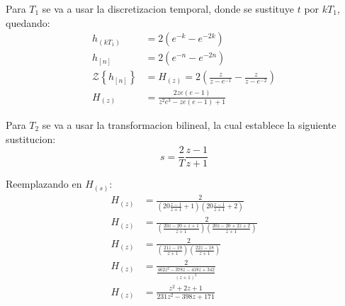 \documentclass[a4paper,12pt]{report}
\begin{document}
\begin{enumerate}[label=\alph*), left=0pt]
                Para $T_1$ se va a usar la discretizacion temporal, donde se sustituye $t$ por $kT_1$, quedando:
                \begin{align*}
                    h_{(kT_1)} &= 2\left(e^{-k} - e^{-2 k}\right)\\
                    h_{[n]} &= 2\left(e^{-n} - e^{-2 n}\right)\\
                    \mathcal{Z}\left\{h_{[n]}\right\} &= H_{(z)} = 2\left(\frac{z}{z - e^{-1}} - \frac{z}{z - e^{-2}} \right)\\
                    H_{(z)} &= \frac{2 z e (e - 1)}{z^2 e^3 - z e (e - 1) + 1}
                \end{align*}

                Para $T_2$ se va a usar la transformacion bilineal, la cual establece la siguiente sustitucion:
                \begin{equation}
                    \label{bilineal}
                    s = \frac{2}{T} \frac{z - 1}{z + 1}
                \end{equation}

                Reemplazando en $H_{(s)}$:
                \begin{align*}
                    H_{(z)} &= \frac{2}{\left(20\frac{z - 1}{z + 1} + 1\right)\left(20\frac{z - 1}{z + 1} + 2\right)}\\
                    H_{(z)} &= \frac{2}{\left(\frac{20z - 20 + z + 1}{z + 1}\right)\left(\frac{20z - 20 + 2z + 2}{z + 1}\right)}\\
                    H_{(z)} &= \frac{2}{\left(\frac{21z - 19}{z + 1}\right)\left(\frac{22z - 18}{z + 1}\right)}\\
                    H_{(z)} &= \frac{2}{\frac{462z^2 - 378z - 418z + 342}{(z + 1)^2}}\\
                    H_{(z)} &= \frac{z^2 + 2z + 1}{231z^2 - 398z + 171}\\
                \end{align*}


\end{enumerate}
\end{document}

